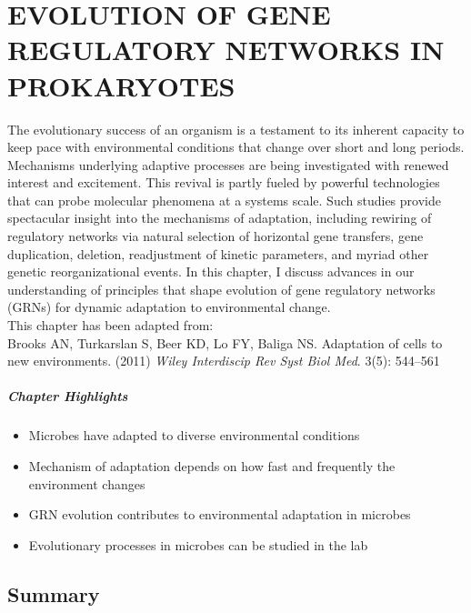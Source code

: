  
\chapter {\uppercase{Evolution of gene regulatory networks in prokaryotes}}
\label{chap:4}

The evolutionary success of an organism is a testament to its inherent capacity to keep pace with environmental conditions that change over short and long periods. Mechanisms underlying adaptive processes are being investigated with renewed interest and excitement. This revival is partly fueled by powerful technologies that can probe molecular phenomena at a systems scale. Such studies provide spectacular insight into the mechanisms of adaptation, including rewiring of regulatory networks via natural selection of horizontal gene transfers, gene duplication, deletion, readjustment of kinetic parameters, and myriad other genetic reorganizational events. In this chapter, I discuss advances in our understanding of principles that shape evolution of gene regulatory networks (GRNs) for dynamic adaptation to environmental change. \\

\noindent This chapter has been adapted from: \\

\noindent Brooks AN, Turkarslan S, Beer KD, Lo FY, Baliga NS. Adaptation of cells to new environments. (2011) \emph{Wiley Interdiscip Rev Syst Biol Med}. 3(5): 544–561\\

\paragraph{Chapter Highlights}

\begin{itemize}
\item Microbes have adapted to diverse environmental conditions 
\item Mechanism of adaptation depends on how fast and frequently the environment changes
\item GRN evolution contributes to environmental adaptation in microbes
\item Evolutionary processes in microbes can be studied in the lab 
\end{itemize}

\section{Summary}


